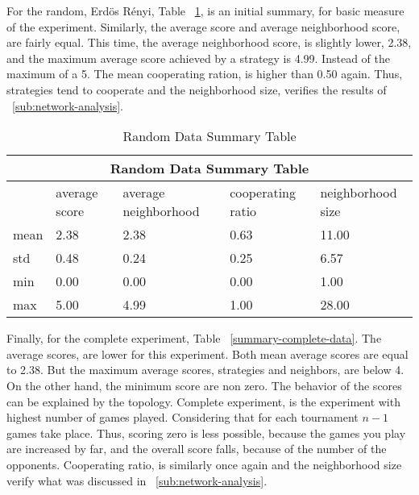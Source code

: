 For the random, Erd\"{o}s R\'{e}nyi, Table ~\ref{summary-random-data}, is
an initial summary, for basic measure of the experiment. Similarly, the average score and average
neighborhood score, are fairly equal. This time, the average neighborhood score,
is slightly lower, 2.38, and the maximum average score achieved by a strategy
is 4.99. Instead of the maximum of a 5. The mean cooperating ration, is higher
than 0.50 again. Thus, strategies tend to cooperate and the neighborhood size,
verifies the results of ~\ref{sub:network-analysis}.

\begin{table}[!hbtp]
	\centering
	\begin{adjustbox}{width=0.8\textwidth}
		\small
		\begin{tabular}{|l|l|l|l|l|}
			\hline
			\multicolumn{5}{|c|}{Random Data Summary Table}                                      \\ \hline
			     & average score & average neighborhood & cooperating ratio & neighborhood size \\ \hline
			mean & 2.38          & 2.38                 & 0.63              & 11.00             \\ \hline
			std  & 0.48          & 0.24                 & 0.25              & 6.57              \\ \hline
			min  & 0.00          & 0.00                 & 0.00              & 1.00              \\ \hline
			max  & 5.00          & 4.99                 & 1.00              & 28.00             \\ \hline
		\end{tabular}
	\end{adjustbox}
	\caption{Random Data Summary Table}
	\label{summary-random-data}
\end{table}

Finally, for the complete experiment, Table ~\ref{summary-complete-data}. The
average scores, are lower for this experiment. Both mean average scores are
equal to 2.38. But the maximum average scores, strategies and neighbors, are
below 4. On the other hand, the minimum score are non zero. The behavior of the
scores can be explained by the topology. Complete experiment, is the experiment
with highest number of games played. Considering that for each tournament
\(n-1\) games take place. Thus, scoring zero is less possible, because the games
you play are increased by far, and the overall score falls, because of the number
of the opponents.
Cooperating ratio, is similarly once again and the neighborhood size
verify what was discussed in ~\ref{sub:network-analysis}.

